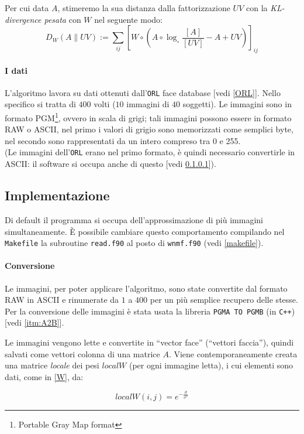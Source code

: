 \documentclass[a4paper]{article} %
\begin{document}
Per cui data $A$, stimeremo la sua distanza dalla fattorizzazione $UV$ con la \emph{KL-divergence \emph{pesata}} con $W$ nel seguente modo:
\[ D_W(A \lVert UV) := \sum_{ij} \left[ W \circ \left( A \circ \log_{\circ} \frac{[A]}{[UV]} - A + UV \right) \right]_{ij} \]

\paragraph{I dati}\label{faces}
L'algoritmo lavora su dati ottenuti dall'\texttt{ORL} face database [vedi \ref{ORL}].
Nello specifico si tratta di $400$ volti ($10$ immagini di $40$ soggetti). Le immagini sono in formato PGM\footnote{Portable Gray Map format}, ovvero in scala di grigi; tali immagini possono essere in formato RAW o ASCII, nel primo i valori di grigio sono memorizzati come semplici byte, nel secondo sono rappresentati da un intero compreso tra 0 e 255. \\ 
(Le immagini dell'\texttt{ORL} erano nel primo formato, è quindi necessario convertirle in ASCII: il software si occupa anche di questo [vedi \ref{paragr:conversione}]).

\subsection{Implementazione}
Di default il programma si occupa dell'approssimazione di più immagini simultaneamente.
È possibile cambiare questo comportamento compilando nel \texttt{Makefile} la subroutine \texttt{read.f90} al posto di \texttt{wnmf.f90} (vedi \ref{makefile}).

\paragraph{Conversione}\label{paragr:conversione}
Le immagini, per poter applicare l'algoritmo, sono state convertite dal formato RAW in ASCII e rinumerate da $1$ a $400$ per un più semplice recupero delle stesse. Per la conversione delle immagini è stata usata la libreria \texttt{PGMA TO PGMB} (in \texttt{C++}) [vedi \ref{itm:A2B}].

Le immagini vengono lette e convertite in ``vector face'' (``vettori faccia''), quindi salvati come vettori colonna di una matrice $A$. Viene contemporaneamente creata una matrice \emph{locale} dei pesi $localW$ (per ogni immagine letta), i cui elementi sono dati, come in \ref{W}, da:

\[ localW(i,j) = e^{-\frac{d}{\sigma^2}} \]
\end{document}
